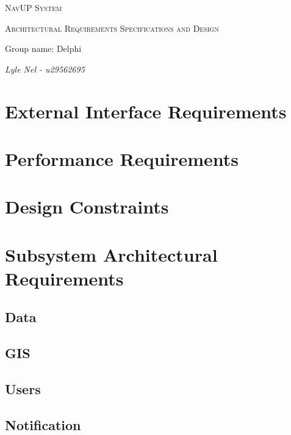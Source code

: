 \documentclass{article}
\begin{document}
\begin{titlepage}
	\centering
	\vfill
	{\scshape\LARGE NavUP System\par}
	\vfill
	{\scshape\Large Architectural Requirements Specifications and Design\par}
	\vfill
	{\Large Group name: Delphi\par}
	\bigskip 
	{\itshape\Large Lyle Nel - u29562695\par}
	\vfill
\end{titlepage}

\tableofcontents

\clearpage

\section{External Interface Requirements}


\section{Performance Requirements}


\section{Design Constraints}


\section{Subsystem Architectural Requirements}

  \subsection{Data}
	

  \subsection{GIS}
	

  \subsection{Users}
	

  \subsection{Notification}
	
\end{document}
